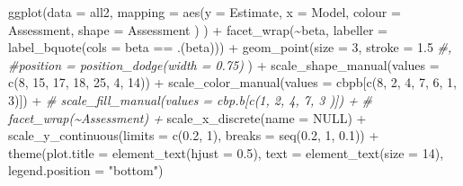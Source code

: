\documentclass[
]{article}
\newenvironment{Shaded}{\begin{snugshade}}{\end{snugshade}}
\newcommand{\AttributeTok}[1]{\textcolor[rgb]{0.77,0.63,0.00}{#1}}
\newcommand{\CommentTok}[1]{\textcolor[rgb]{0.56,0.35,0.01}{\textit{#1}}}
\newcommand{\ConstantTok}[1]{\textcolor[rgb]{0.00,0.00,0.00}{#1}}
\newcommand{\DecValTok}[1]{\textcolor[rgb]{0.00,0.00,0.81}{#1}}
\newcommand{\FloatTok}[1]{\textcolor[rgb]{0.00,0.00,0.81}{#1}}
\newcommand{\FunctionTok}[1]{\textcolor[rgb]{0.00,0.00,0.00}{#1}}
\newcommand{\NormalTok}[1]{#1}
\newcommand{\SpecialCharTok}[1]{\textcolor[rgb]{0.00,0.00,0.00}{#1}}
\newcommand{\StringTok}[1]{\textcolor[rgb]{0.31,0.60,0.02}{#1}}
\begin{document}
\begin{Shaded}
\begin{Highlighting}[]
\FunctionTok{ggplot}\NormalTok{(}\AttributeTok{data =}\NormalTok{ all2,}
       \AttributeTok{mapping =} \FunctionTok{aes}\NormalTok{(}\AttributeTok{y =}\NormalTok{ Estimate,}
                     \AttributeTok{x =}\NormalTok{ Model, }
                     \AttributeTok{colour =}\NormalTok{ Assessment,}
                     \AttributeTok{shape =}\NormalTok{ Assessment}
\NormalTok{                     )}
\NormalTok{       ) }\SpecialCharTok{+}
  \FunctionTok{facet\_wrap}\NormalTok{(}\SpecialCharTok{\textasciitilde{}}\NormalTok{beta,}
             \AttributeTok{labeller =} \FunctionTok{label\_bquote}\NormalTok{(}\AttributeTok{cols =}\NormalTok{ beta }\SpecialCharTok{==}\NormalTok{ .(beta))) }\SpecialCharTok{+}
  \FunctionTok{geom\_point}\NormalTok{(}\AttributeTok{size =} \DecValTok{3}\NormalTok{, }\AttributeTok{stroke =} \FloatTok{1.5}
             \CommentTok{\#,}
             \CommentTok{\#position = position\_dodge(width = 0.75)}
\NormalTok{             ) }\SpecialCharTok{+}
  \FunctionTok{scale\_shape\_manual}\NormalTok{(}\AttributeTok{values =} \FunctionTok{c}\NormalTok{(}\DecValTok{8}\NormalTok{, }\DecValTok{15}\NormalTok{, }\DecValTok{17}\NormalTok{, }\DecValTok{18}\NormalTok{, }\DecValTok{25}\NormalTok{, }\DecValTok{4}\NormalTok{, }\DecValTok{14}\NormalTok{)) }\SpecialCharTok{+}
  \FunctionTok{scale\_color\_manual}\NormalTok{(}\AttributeTok{values =}\NormalTok{ cbpb[}\FunctionTok{c}\NormalTok{(}\DecValTok{8}\NormalTok{, }\DecValTok{2}\NormalTok{, }\DecValTok{4}\NormalTok{, }\DecValTok{7}\NormalTok{, }\DecValTok{6}\NormalTok{, }\DecValTok{1}\NormalTok{, }\DecValTok{3}\NormalTok{)]) }\SpecialCharTok{+}
  \CommentTok{\# scale\_fill\_manual(values = cbp.b[c(1, 2, 4, 7, 3 )]) +}
  \CommentTok{\# facet\_wrap(\textasciitilde{}Assessment) +}
  \FunctionTok{scale\_x\_discrete}\NormalTok{(}\AttributeTok{name =} \ConstantTok{NULL}\NormalTok{) }\SpecialCharTok{+}
  \FunctionTok{scale\_y\_continuous}\NormalTok{(}\AttributeTok{limits =} \FunctionTok{c}\NormalTok{(}\FloatTok{0.2}\NormalTok{, }\DecValTok{1}\NormalTok{),}
                     \AttributeTok{breaks =} \FunctionTok{seq}\NormalTok{(}\FloatTok{0.2}\NormalTok{, }\DecValTok{1}\NormalTok{, }\FloatTok{0.1}\NormalTok{)) }\SpecialCharTok{+}
  \FunctionTok{theme}\NormalTok{(}\AttributeTok{plot.title =} \FunctionTok{element\_text}\NormalTok{(}\AttributeTok{hjust =} \FloatTok{0.5}\NormalTok{), }
        \AttributeTok{text =} \FunctionTok{element\_text}\NormalTok{(}\AttributeTok{size =} \DecValTok{14}\NormalTok{),}
        \AttributeTok{legend.position =} \StringTok{"bottom"}\NormalTok{)}
\end{Highlighting}
\end{Shaded}
\end{document}
